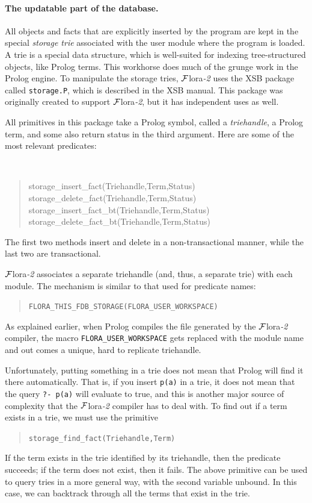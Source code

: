 \documentclass[11pt]{article}
\newcommand{\FLORA}{{\mbox{\sc ${\cal F}${lora}\rm\emph{-2}}}\xspace}
\begin{document}
\paragraph{The updatable part of the database.}
All objects and facts that are explicitly inserted by the program are kept
in the special \emph{storage trie} associated with the user module where the
program is loaded. A trie is a special data structure, which is
well-suited for indexing tree-structured objects, like Prolog terms. This
workhorse does much of the grunge work in the Prolog engine. To manipulate the
storage tries, \FLORA uses the XSB package called {\tt storage.P}, which is
described in the XSB manual. This package was originally created to support
\FLORA, but it has independent uses as well.

All primitives in this package take a Prolog symbol, called a
\emph{triehandle}, a Prolog term, and some also return status in the third
argument. Here are some of the most relevant predicates:
{\tt
\begin{quote}
  storage\_insert\_fact(Triehandle,Term,Status)\\
  storage\_delete\_fact(Triehandle,Term,Status)\\
  storage\_insert\_fact\_bt(Triehandle,Term,Status)\\
  storage\_delete\_fact\_bt(Triehandle,Term,Status)
\end{quote}
}
\noindent
The first two methods insert and delete in a non-transactional manner,
while the last two are transactional.

\FLORA associates a separate triehandle (and, thus, a separate trie) with
each module. The mechanism is similar to that used for predicate names:
\begin{quote}
 \tt FLORA\_THIS\_FDB\_STORAGE(FLORA\_USER\_WORKSPACE)  
\end{quote}
As explained earlier, when Prolog compiles the file generated by the
\FLORA compiler, the macro {\tt FLORA\_USER\_WORKSPACE} gets replaced with
the module name and out comes a unique, hard to replicate triehandle.

Unfortunately, putting something in a trie does not mean that Prolog will find
it there automatically. That is, if you insert {\tt p(a)} in a trie, it
does not mean that the query {\tt ?- p(a)} will evaluate to true, and this
is another major source of complexity that the \FLORA compiler has to deal
with. To find out if a term exists in a trie, we must use the primitive
\begin{quote}
 \tt storage\_find\_fact(Triehandle,Term)  
\end{quote}
If the term exists in the trie identified by its triehandle, then the
predicate succeeds; if the term does not exist, then it fails. The above
primitive can be used to query tries in a more general way, with the second
variable unbound. In this case, we can backtrack through all the terms that
exist in the trie.
\end{document}
